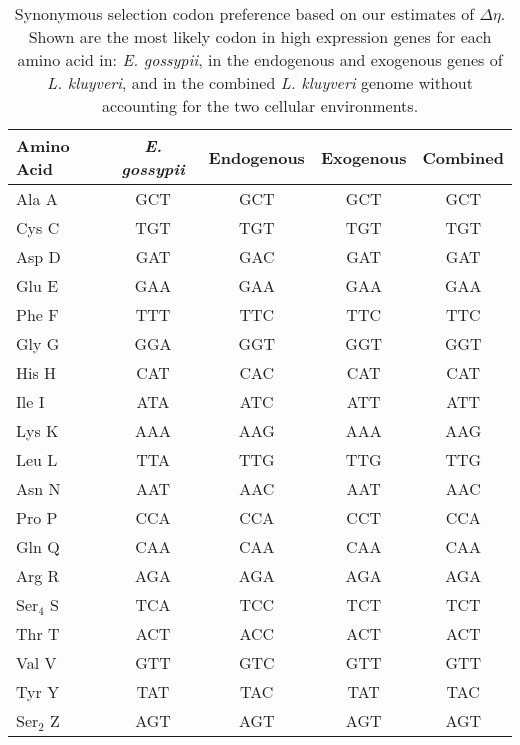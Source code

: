 \documentclass{bmcart}
\newcommand{\kluyveri}{\textit{L. kluyveri}\xspace}
\newcommand{\gossypii}{\textit{E. gossypii}\xspace}
\newcommand{\DE}{\ensuremath{{\Delta \eta}}\xspace}
\begin{document}
\begin{backmatter}
\clearpage

\begin{table}
    \centering
    \caption{Synonymous selection codon preference based on our estimates of $\DE$.
	 Shown are the most likely codon in high expression genes for each amino acid in: \gossypii, in the endogenous and exogenous genes of \kluyveri, and in the combined \kluyveri genome without accounting for the two cellular environments.}
\begin{tabular}{  l  c  c  c  c  }
\hline
	Amino Acid & \gossypii & Endogenous & Exogenous & Combined \\ \hline
	Ala A & GCT & GCT & GCT & GCT \\ 
	Cys C & TGT & TGT & TGT & TGT \\ 
	Asp D & GAT & GAC & GAT & GAT \\ 
	Glu E & GAA & GAA & GAA & GAA \\ 
	Phe F & TTT & TTC & TTC & TTC \\ 
	Gly G & GGA & GGT & GGT & GGT \\ 
	His H & CAT & CAC & CAT & CAT \\ 
	Ile I & ATA & ATC & ATT & ATT \\ 
	Lys K & AAA & AAG & AAA & AAG \\ 
	Leu L & TTA & TTG & TTG & TTG \\ 
	Asn N & AAT & AAC & AAT & AAC \\ 
	Pro P & CCA & CCA & CCT & CCA \\ 
	Gln Q & CAA & CAA & CAA & CAA \\ 
	Arg R & AGA & AGA & AGA & AGA \\ 
	Ser$_4$ S & TCA & TCC & TCT & TCT \\ 
	Thr T & ACT & ACC & ACT & ACT \\ 
	Val V & GTT & GTC & GTT & GTT \\ 
	Tyr Y & TAT & TAC & TAT & TAC \\ 
	Ser$_2$ Z & AGT & AGT & AGT & AGT \\ \hline
\end{tabular}
    \label{tab:codon_pref_deta}
\end{table}
\clearpage



\end{backmatter}
\end{document}

